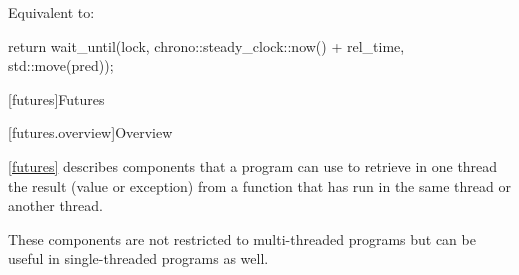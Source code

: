 \begin{itemdescr}
\pnum
\effects Equivalent to:
\begin{codeblock}
return wait_until(lock, chrono::steady_clock::now() + rel_time, std::move(pred));
\end{codeblock}
\end{itemdescr}

[futures]{Futures}

[futures.overview]{Overview}

\pnum
\ref{futures} describes components that a \Cpp program can use to retrieve in one thread the
result (value or exception) from a function that has run in the same thread or another thread.
\begin{note} These components are not restricted to multi-threaded programs but can be useful in
single-threaded programs as well. \end{note}


